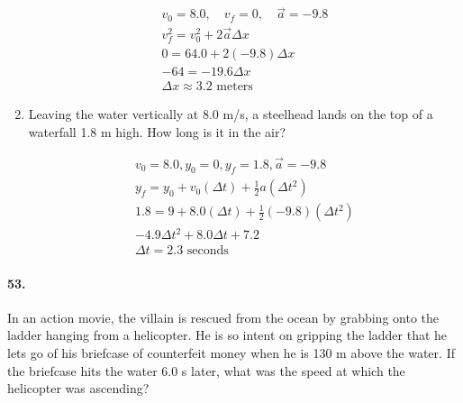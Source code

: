 \begin{multicols*}{2}
\begin{enumerate}[label=\alph*.]
            \begin{mdframed}
                \begin{equation*}
                    \begin{gathered}
                        v_0 = 8.0, \quad v_f = 0, \quad \vec{a} = -9.8 \\
                        v_f^2 = v_0^2 + 2\vec{a}\Delta x    \\
                        0 = 64.0 + 2(-9.8)\Delta x \\
                        -64 = -19.6\Delta x \\
                        \Delta x \approx \boxed{3.2 \text{ meters}} 
                    \end{gathered}
                \end{equation*}
            \end{mdframed}

            \item Leaving the water vertically at 8.0 m/s, a steelhead lands on
            the top of a waterfall 1.8 m high. How long is it in the air?

            \begin{mdframed}
                \begin{equation*}
                    \begin{gathered}
                        v_0 = 8.0, y_0 = 0, y_f = 1.8, \vec{a} = -9.8 \\
                        y_{f} = y_{0} + v_{0}(\Delta t) + \frac{1}{2}a(\Delta t^{2})    \\
                        1.8 = 9 + 8.0(\Delta t) + \frac{1}{2}(-9.8)(\Delta t^2) \\
                        -4.9\Delta t^2 + 8.0\Delta t + 7.2    \\
                        \Delta t = \boxed{2.3 \text{ seconds}}
                    \end{gathered}
                \end{equation*}
            \end{mdframed}
        \end{enumerate}

        \paragraph*{53.}
        In an action movie, the villain is rescued from the ocean by grabbing onto the ladder hanging from a helicopter. He is so intent on gripping the ladder that he lets go of his briefcase of counterfeit money when he is 130 m above the water. If the briefcase hits the water 6.0 s later, what was the speed at which the helicopter was ascending?


\end{multicols*}
